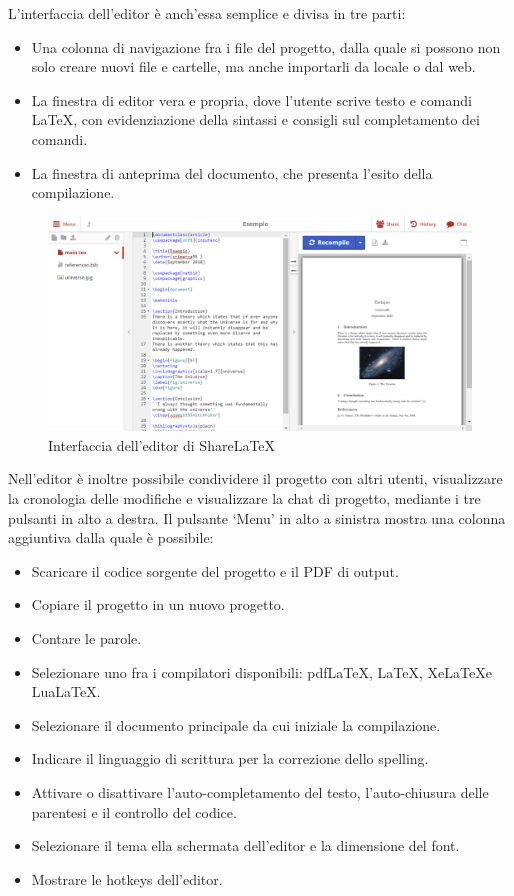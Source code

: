 L'interfaccia dell'editor è anch'essa semplice e divisa in tre parti:
\begin{itemize}
    \item Una colonna di navigazione fra i file del progetto, dalla quale si possono non solo creare nuovi file e cartelle, ma anche importarli da locale o dal web.
    \item La finestra di editor vera e propria, dove l'utente scrive testo e comandi \LaTeX, con evidenziazione della sintassi e consigli sul completamento dei comandi.
    \item La finestra di anteprima del documento, che presenta l'esito della compilazione.
\end{itemize}
\begin{figure}[h]
    \centering
    \includegraphics[width=\textwidth]{immagini/editor.PNG}
    \caption{Interfaccia dell'editor di ShareLaTeX}
    \label{fig:sharelatex_editor}
\end{figure}
Nell'editor è inoltre possibile condividere il progetto con altri utenti, visualizzare la cronologia delle modifiche e visualizzare la chat di progetto, mediante i tre pulsanti in alto a destra.
Il pulsante \enquote*{Menu} in alto a sinistra mostra una colonna aggiuntiva dalla quale è possibile:
\begin{itemize}
    \item Scaricare il codice sorgente del progetto e il PDF di output.
    \item Copiare il progetto in un nuovo progetto.
    \item Contare le parole.
    \item Selezionare uno fra i compilatori disponibili: pdf\LaTeX, \LaTeX, Xe\LaTeX e Lua\LaTeX.
    \item Selezionare il documento principale da cui iniziale la compilazione.
    \item Indicare il linguaggio di scrittura per la correzione dello spelling.
    \item Attivare o disattivare l'auto-completamento del testo, l'auto-chiusura delle parentesi e il controllo del codice.
    \item Selezionare il tema ella schermata dell'editor e la dimensione del font.
    \item Mostrare le hotkeys dell'editor.
\end{itemize}

